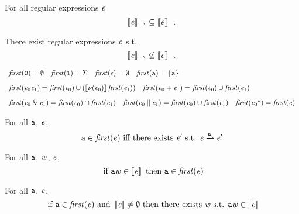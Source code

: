 \begin{theorem}
 For all regular expressions $\re$
 \[
  \opSem{\re}{\parDer{}}\subseteq\opSem{\re}{\parDer{}{}}
 \]
\end{theorem}

\begin{theorem}
 There exist regular expressions $\re$ s.t.
 \[
  \opSem{\re}{\parDer{}{}}\not\subseteq\opSem{\re}{\parDer{}}
 \]
\end{theorem}

\begin{definition}
 \[
  \begin{array}{l}
   \first{\none}=\emptyset\quad \first{\all}=\symAlph \quad \first{\eps}=\emptyset \quad \first{\sym}=\{\sym\}                                      \\[2ex]
   \first{\re_0\catop\re_1}=\first{\re_0}\cup(\sem{\hasEps{\re_0}}\catop\first{\re_1}) \quad \first{\re_0\orop\re_1}=\first{\re_0}\cup\first{\re_1} \\[2ex]
   \first{\re_0\andop\re_1}=\first{\re_0}\cap\first{\re_1} \quad \first{\re_0\shuffleop\re_1}=\first{\re_0}\cup\first{\re_1} \quad
   \first{\starop{\re_0}}=\first{\re}
  \end{array}
 \]
\end{definition}

\begin{theorem}
 For all $\sym$, $\re$,
 \[
  \sym\in\first{\re} \mbox{ iff there exists } \re' \mbox{ s.t. } \re\parDer{\sym}\re'
 \]
\end{theorem}

\begin{theorem}
 For all $\sym$, $\word$, $\re$,
 \[
  \mbox{ if } \sym\catop\word\in\sem{\re} \mbox{ then } \sym\in\first{\re}
 \]
\end{theorem}

\begin{theorem}
 For all $\sym$, $\re$,
 \[
  \mbox{ if } \sym\in\first{\re} \mbox{ and } \sem{\re}\neq\emptyset \mbox{ then there exists } \word \mbox{ s.t. } \sym\word\in\sem{\re}
 \]
\end{theorem}

